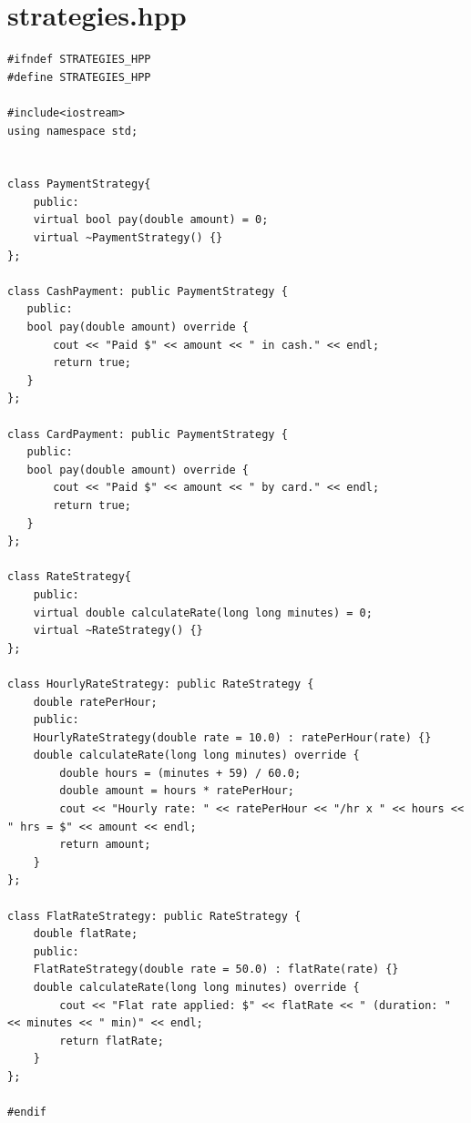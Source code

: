 \documentclass[11pt,a4paper]{article}
\begin{document}
\section{strategies.hpp}
\begin{lstlisting}[title={\texttt{strategies.hpp}}]
#ifndef STRATEGIES_HPP
#define STRATEGIES_HPP

#include<iostream>
using namespace std;


class PaymentStrategy{
    public:
    virtual bool pay(double amount) = 0;
    virtual ~PaymentStrategy() {}
};

class CashPayment: public PaymentStrategy {
   public:
   bool pay(double amount) override {
       cout << "Paid $" << amount << " in cash." << endl;
       return true;
   }
};

class CardPayment: public PaymentStrategy {
   public:
   bool pay(double amount) override {
       cout << "Paid $" << amount << " by card." << endl;
       return true;
   }
};

class RateStrategy{
    public:
    virtual double calculateRate(long long minutes) = 0;
    virtual ~RateStrategy() {}
};

class HourlyRateStrategy: public RateStrategy {
    double ratePerHour;
    public:
    HourlyRateStrategy(double rate = 10.0) : ratePerHour(rate) {}
    double calculateRate(long long minutes) override {
        double hours = (minutes + 59) / 60.0;
        double amount = hours * ratePerHour;
        cout << "Hourly rate: " << ratePerHour << "/hr x " << hours << " hrs = $" << amount << endl;
        return amount;
    }
};

class FlatRateStrategy: public RateStrategy {
    double flatRate;
    public:
    FlatRateStrategy(double rate = 50.0) : flatRate(rate) {}
    double calculateRate(long long minutes) override {
        cout << "Flat rate applied: $" << flatRate << " (duration: " << minutes << " min)" << endl;
        return flatRate;
    }
};

#endif
\end{lstlisting}

\newpage
\end{document}
